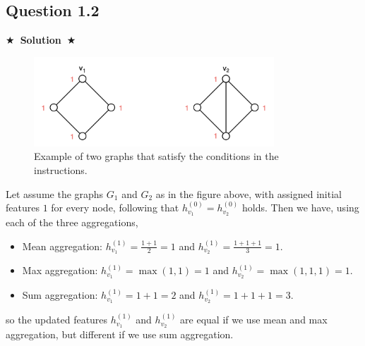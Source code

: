 \documentclass{article}
\newcommand{\Solution}[1]{{\medskip \color{black} \bf $\bigstar$~\sf \textbf{Solution}~$\bigstar$ \sf #1 } \bigskip}
\begin{document}

\subsection*{Question 1.2}
\Solution{

  \noindent
  \begin{figure}[ht!]
    \centering
    \includegraphics[width=90mm]{Slike/1_2.png}
    \caption{Example of two graphs that satisfy the conditions in the instructions.}
  \end{figure}

\noindent
Let assume the graphs $G_1$ and $G_2$ as in the figure above, with assigned initial features $1$ for every node, following 
that $h_{v_1}^{(0)} = h_{v_2}^{(0)}$ holds. 
Then we have, using each of the three aggregations, 
\begin{itemize} 
  \item Mean aggregation: $h_{v_1}^{(1)} = \frac{1 + 1}{2} = 1$ and $h_{v_2}^{(1)} = \frac{1 + 1 + 1}{3} = 1$.
  \item Max aggregation: $h_{v_1}^{(1)} = \max(1, 1) = 1$ and $h_{v_2}^{(1)} = \max(1, 1, 1) = 1$.
  \item Sum aggregation: $h_{v_1}^{(1)} = 1 + 1 = 2$ and $h_{v_2}^{(1)} = 1 + 1 + 1 = 3$.
\end{itemize}
so the updated features $h_{v_1}^{(1)}$ and $h_{v_2}^{(1)}$ are equal if we use mean and max aggregation, but different if we use sum aggregation.
}

\end{document}

